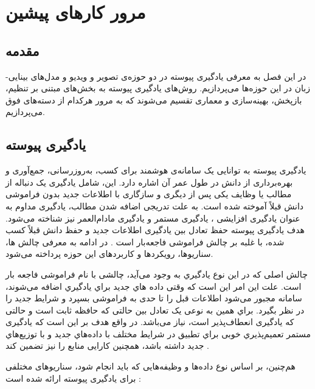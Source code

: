 \chapter{مرور کارهای پیشین}
\label{chap2:methods}
\section{مقدمه}
در این فصل به معرفی یادگیری پیوسته در دو حوزه‌ی تصویر و ویدیو و مدل‌های بینایی-زبان در این حوزه‌ها می‌پردازیم. روش‌های یادگیری پیوسته به بخش‌های مبتنی بر تنظیم، بازپخش، بهینه‌سازی و معماری تقسیم می‌شوند که به مرور هرکدام از دسته‌های فوق می‌پردازیم. 

\section{یادگیری پیوسته}
یادگیری پیوسته به توانایی یک سامانه‌ی هوشمند برای کسب، به‌روزرسانی، جمع‌آوری و بهره‌برداری از دانش در طول عمر آن اشاره دارد. این، شامل یادگیری یک دنباله از مطالب یا وظایف یکی پس از دیگری و سازگاری با اطلاعات جدید بدون فراموشی دانش قبلاً آموخته شده است. به علت تدریجی اضافه شدن مطالب، یادگیری مداوم به عنوان یادگیری افزایشی ، یادگیری مستمر  و یادگیری مادام‌العمر  نیز شناخته می‌شود. هدف یادگیری پیوسته حفظ تعادل بین یادگیری اطلاعات جدید و حفظ دانش قبلاً کسب شده، با غلبه بر چالش فراموشی فاجعه‌بار است \cite{1,2}. در ادامه به معرفی چالش ها، سناریوها، رویکردها و کاربردهای این حوزه پرداخته می‌شود.


چالش اصلی که در این نوع یادگیري به وجود می‌آید، چالشی با نام فراموشی فاجعه بار است. علت این امر این است که وقتی داده هاي جدید براي یادگیري اضافه می‌شوند، سامانه مجبور می‌شود اطلاعات قبل را تا حدی به فراموشی بسپرد و شرایط جدید را در نظر بگیرد. براي همین به نوعی یک تعادل بین حالتی که حافظه ثابت است و حالتی که یادگیری انعطاف‌پذیر است، نیاز می‌باشد. در واقع هدف بر این است که یادگیری مستمر تعمیم‌پذیري خوبی براي تطبیق در شرایط مختلف با داده‌هاي جدید و با توزیع‌هاي جدید داشته باشد، همچنین کارایی منابع را نیز تضمین کند 
\cite{1, 2}
.

هم‌چنین، بر اساس نوع داده‌ها و وظیفه‌هایی که باید انجام شود، سناریوهای مختلفی برای یادگیری پیوسته ارائه شده است 
\cite{1}:

